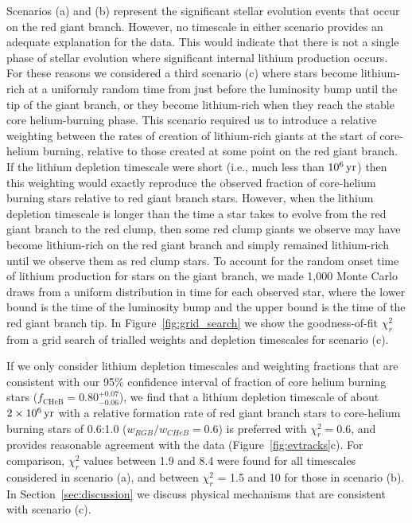 \documentclass[twocolumn]{aastex62}
\begin{document}
Scenarios (a) and (b) represent the significant stellar evolution events that occur on the red giant branch. However, no timescale in either scenario provides an adequate explanation for the data. This would indicate that there is not a single phase of stellar evolution where significant internal lithium production occurs. For these reasons we considered a third scenario (c) where stars become lithium-rich at a uniformly random time from just before the luminosity bump until the tip of the giant branch, or they become
lithium-rich when they reach the stable core helium-burning phase. This scenario required us to introduce a relative weighting between the rates of creation of lithium-rich giants at the start of core-helium burning, relative to those created at some point on the red giant branch. If the lithium depletion timescale were short (i.e., much less than $10^6\,{\rm yr}$) then this weighting would exactly reproduce the observed fraction of core-helium burning stars relative to red giant branch stars. However, when the lithium depletion timescale is longer than the time a star takes to evolve from the red giant branch to the red clump, then some red clump giants we observe may have become lithium-rich on the red giant branch and simply remained lithium-rich until we observe them as red clump stars. To account for the random onset time of lithium production  for stars on the giant branch, we made 1,000 Monte Carlo draws from a uniform distribution in time for each observed star, where the lower bound is the time of the luminosity bump and the upper bound is the time of the red giant branch tip. In Figure~\ref{fig:grid_search} we show the goodness-of-fit $\chi_r^2$ from a grid search of trialled weights and depletion timescales for scenario (c). 

If we only consider lithium depletion timescales and weighting fractions that are consistent with our 95\% confidence interval of fraction of core helium burning stars ($f_\mathrm{CHeB} = 0.80^{+0.07}_{-0.06}$), we find that a lithium depletion timescale of about $2\times 10^{6}\,{\rm yr}$ with a relative formation rate of red giant branch stars to core-helium burning stars of 0.6:1.0 ($w_{RGB}/w_{CHeB} = 0.6$) is preferred with $\chi_r^2 = 0.6$, and provides reasonable agreement with the data (Figure~\ref{fig:evtracks}c). For comparison, $\chi_r^2$ values between 1.9 and 8.4 were found for all timescales considered in scenario (a), and between $\chi_r^2$ = 1.5 and 10 for those in scenario (b).
In Section~\ref{sec:discussion} we discuss physical mechanisms that are consistent with scenario (c).
 
\end{document}
